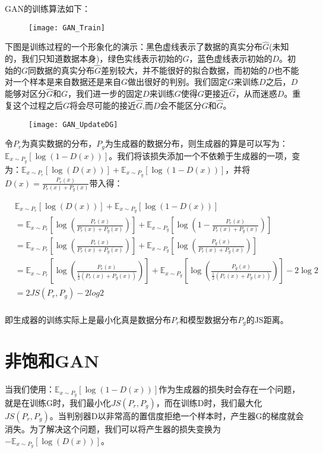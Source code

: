 GAN的训练算法如下：

\begin{figure}[htbp]
\centering
\texttt{[image: GAN\_Train]}
\end{figure}


下图是训练过程的一个形象化的演示：黑色虚线表示了数据的真实分布$\hat{G}$(未知的，我们只知道数据本身)，绿色实线表示初始的$G$，蓝色虚线表示初始的$D$。初始的$G$同数据的真实分布$\hat{G}$差别较大，并不能很好的拟合数据，而初始的$D$也不能对一个样本是来自数据还是来自$G$做出很好的判别。我们固定$G$来训练$D$之后，$D$能够对区分$\hat{G}$和$G$，我们进一步的固定$D$来训练$G$使得$G$更接近$\hat{G}$，从而迷惑$D$。重复这个过程之后$G$将会尽可能的接近$\hat{G}$,而$D$会不能区分$G$和$\hat{G}$。
\begin{figure}[htbp]
\centering
\texttt{[image: GAN\_UpdateDG]}
\end{figure}

令$P_r$为真实数据的分布，$P_g$为生成器的数据分布，则生成器的算是可以写为：$\mathbb{E}_{x \sim P_g}[\log (1- D(x))]$。我们将该损失添加一个不依赖于生成器的一项，变为：$\mathbb{E}_{x \sim P_r}[\log (D(x))] + \mathbb{E}_{x \sim P_g}[\log (1- D(x))]$，并将$D(x) = \frac{P_{r}(x)}{P_{r}(x) + P_{g}(x)}$带入得：

\begin{displaymath}
\begin{split}
&\mathbb{E}_{x \sim P_r}[\log (D(x))] + \mathbb{E}_{x \sim P_g}[\log (1- D(x))] \\
&= \mathbb{E}_{x \sim P_r}[\log (\frac{P_{r}(x)}{P_{r}(x) + P_{g}(x)})] + \mathbb{E}_{x \sim P_g}[\log (1- \frac{P_{r}(x)}{P_{r}(x) + P_{g}(x)})] \\
&= \mathbb{E}_{x \sim P_r}[\log (\frac{P_{r}(x)}{P_{r}(x) + P_{g}(x)})] + \mathbb{E}_{x \sim P_g}[\log (\frac{P_{g}(x)}{P_{r}(x) + P_{g}(x)})] \\
&= \mathbb{E}_{x \sim P_r}[\log (\frac{P_{r}(x)}{\frac{1}{2}(P_{r}(x) + P_{g}(x))})] + \mathbb{E}_{x \sim P_g}[\log (\frac{P_{g}(x)}{\frac{1}{2}(P_{r}(x) + P_{g}(x))})] -2 \log 2 \\
&= 2 JS(P_r, P_g) - 2log2\\
\end{split}
\end{displaymath}

即生成器的训练实际上是最小化真是数据分布$P_r$和模型数据分布$P_g$的JS距离。

\section{非饱和GAN}
当我们使用：$\mathbb{E}_{x \sim P_g}[\log (1- D(x))]$作为生成器的损失时会存在一个问题，就是在训练G时，我们最小化$JS(P_r, P_g)$，而在训练D时，我们最大化$JS(P_r, P_g)$。当判别器D以非常高的置信度拒绝一个样本时，产生器G的梯度就会消失。为了解决这个问题，我们可以将产生器的损失变换为$-\mathbb{E}_{x \sim P_g}[\log (D(x))]$。

